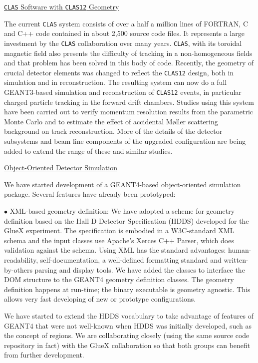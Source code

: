 \documentclass[12pt]{article}
\begin{document}
\vskip 0.5cm

\noindent
\underline{{\tt CLAS} Software with {\tt CLAS12} Geometry}

The current {\tt CLAS} system consists of over a half a million lines of 
FORTRAN, C and C++ code contained in about 2,500 source code files. It 
represents a large investment by the {\tt CLAS} collaboration over many 
years. {\tt CLAS}, with its toroidal magnetic field also presents the 
difficulty of tracking in a non-homogeneous fields and that problem has 
been solved in this body of code. Recently, the geometry of crucial detector 
elements was changed to reflect the {\tt CLAS12} design, both in simulation 
and in reconstruction. The resulting system can now do a full GEANT3-based 
simulation and reconstruction of {\tt CLAS12} events, in particular charged 
particle tracking in the forward drift chambers. Studies using this system 
have been carried out to verify momentum resolution results from the 
parametric Monte Carlo and to estimate the effect of accidental M{\o}ller 
scattering background on track reconstruction. More of the details of the 
detector subsystems and beam line components of the upgraded configuration 
are being added to extend the range of these and similar studies.

\vskip 0.5cm

\noindent
\underline{Object-Oriented Detector Simulation}

We have started development of a GEANT4-based object-oriented simulation 
package. Several features have already been prototyped:

\vskip 0.5cm

\noindent
$\bullet$ XML-based geometry definition:
We have adopted a scheme for geometry definition based on the Hall D Detector 
Specification (HDDS) developed for the GlueX experiment. The specification is 
embodied in a W3C-standard XML schema and the input classes use Apache's 
Xerces C++ Parser, which does validation against the schema. Using XML has 
the standard advantages: human-readability, self-documentation, a well-defined 
formatting standard and written-by-others parsing and display tools. We have 
added the classes to interface the DOM structure to the GEANT4 geometry 
definition classes. The geometry definition happens at run-time; the binary 
executable is geometry agnostic. This allows very fast developing of new or 
prototype configurations.

We have started to extend the HDDS vocabulary to take advantage of features 
of GEANT4 that were not well-known when HDDS was initially developed, such 
as the concept of regions. We are collaborating closely (using the same 
source code repository in fact) with the GlueX collaboration so that both 
groups can benefit from further development.
\end{document}
